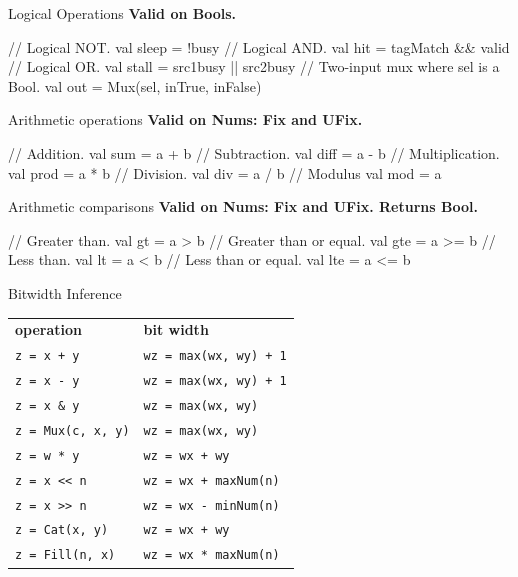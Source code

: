 \documentclass[xcolor=pdflatex,dvipsnames,table]{beamer}
\begin{document}
\begin{frame}[fragile]{Logical Operations}
\textbf{Valid on Bools. }
\begin{scala}
// Logical NOT. 
val sleep = !busy                     
// Logical AND.
val hit   = tagMatch && valid         
// Logical OR.
val stall = src1busy || src2busy      
// Two-input mux where sel is a Bool.  
val out   = Mux(sel, inTrue, inFalse) 
\end{scala}
\end{frame}

\begin{frame}[fragile]{Arithmetic operations}
\textbf{Valid on Nums: Fix and UFix. }
\begin{scala}
// Addition. 
val sum  = a + b  
// Subtraction.
val diff = a - b  
// Multiplication. 
val prod = a * b  
// Division.
val div  = a / b  
// Modulus
val mod  = a %
\end{scala}
\end{frame}

\begin{frame}[fragile]{Arithmetic comparisons}
\textbf{Valid on Nums: Fix and UFix. Returns Bool.}
\begin{scala}
// Greater than.
val gt  = a > b   
// Greater than or equal.
val gte = a >= b  
// Less than.
val lt  = a < b   
// Less than or equal.
val lte = a <= b  
\end{scala}
\end{frame}

\begin{frame}[fragile]{Bitwidth Inference}
\begin{center}
\begin{tabular}{ll}
{\bf operation} & {\bf bit width} \\ 
\verb|z = x + y| & \verb|wz = max(wx, wy) + 1| \\
\verb+z = x - y+ & \verb|wz = max(wx, wy) + 1|\\
\verb+z = x & y+ & \verb+wz = max(wx, wy)+ \\
\verb+z = Mux(c, x, y)+ & \verb+wz = max(wx, wy)+ \\
\verb+z = w * y+ & \verb!wz = wx + wy! \\
\verb+z = x << n+ & \verb!wz = wx + maxNum(n)! \\
\verb+z = x >> n+ & \verb+wz = wx - minNum(n)+ \\
\verb+z = Cat(x, y)+ & \verb!wz = wx + wy! \\
\verb+z = Fill(n, x)+ & \verb+wz = wx * maxNum(n)+ \\
\end{tabular}
\end{center}
\end{frame}
\end{document}
